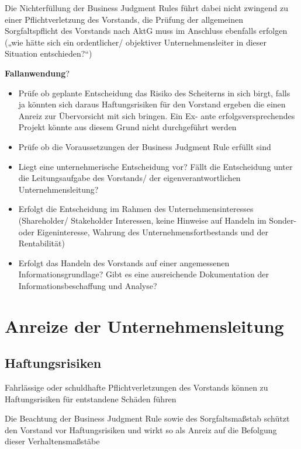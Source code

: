 \documentclass[
]{article}
\providecommand{\tightlist}{%
  \setlength{\itemsep}{0pt}\setlength{\parskip}{0pt}}
\begin{document}
Die Nichterfüllung der Business Judgment Rules führt dabei nicht
zwingend zu einer Pflichtverletzung des Vorstands, die Prüfung der
allgemeinen Sorgfaltspflicht des Vorstands nach AktG muss im Anschluss
ebenfalls erfolgen („wie hätte sich ein ordentlicher/ objektiver
Unternehmensleiter in dieser Situation entschieden?{}``)

\textbf{Fallanwendung}?

\begin{itemize}
\tightlist
\item
  Prüfe ob geplante Entscheidung das Risiko des Scheiterns in sich
  birgt, falls ja könnten sich daraus Haftungsrisiken für den Vorstand
  ergeben die einen Anreiz zur Übervorsicht mit sich bringen. Ein Ex-
  ante erfolgsversprechendes Projekt könnte aus diesem Grund nicht
  durchgeführt werden
\item
  Prüfe ob die Voraussetzungen der Business Judgment Rule erfüllt sind
\item
  Liegt eine unternehmerische Entscheidung vor? Fällt die Entscheidung
  unter die Leitungsaufgabe des Vorstands/ der eigenverantwortlichen
  Unternehmensleitung?
\item
  Erfolgt die Entscheidung im Rahmen des Unternehmensinteresses
  (Shareholder/ Stakeholder Interessen, keine Hinweise auf Handeln im
  Sonder- oder Eigeninteresse, Wahrung des Unternehmensfortbestands und
  der Rentabilität)
\item
  Erfolgt das Handeln des Vorstands auf einer angemessenen
  Informationsgrundlage? Gibt es eine ausreichende Dokumentation der
  Informationsbeschaffung und Analyse?
\end{itemize}

\hypertarget{anreize-der-unternehmensleitung}{%
\section{Anreize der
Unternehmensleitung}\label{anreize-der-unternehmensleitung}}

\hypertarget{haftungsrisiken}{%
\subsection{Haftungsrisiken}\label{haftungsrisiken}}

Fahrlässige oder schuldhafte Pflichtverletzungen des Vorstands können zu
Haftungsrisiken für entstandene Schäden führen

Die Beachtung der Business Judgment Rule sowie des Sorgfaltsmaßstab
schützt den Vorstand vor Haftungsrisiken und wirkt so als Anreiz auf die
Befolgung dieser Verhaltensmaßstäbe
\end{document}
